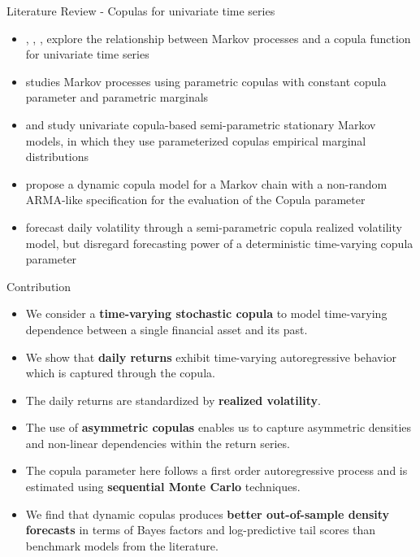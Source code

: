 \documentclass[9pt,xcolor=x11names,compress]{beamer}
\newcommand{\btext}{\textcolor{dblue}}
\newcommand{\bbtext}[1]{ \textcolor{dblue}{\textbf{#1}}}
\newcommand{\rbtext}[1]{ \textcolor{dred}{\textbf{#1}}}
\let\natbibcitet\citet
\renewcommand\citet{\bibpunct{(}{)}{,}{a}{,}{,}\natbibcitet}
\let\oldcite=\cite
\renewcommand{\cite}[1]{\textcolor{dblue}{\oldcite{#1}}}
\begin{document}
\begin{frame}{Literature Review - Copulas for univariate time series}
	\begin{itemize}
		\item \cite{darsow1992}, \cite{ibragimov2008}, \cite{ibragimov2009}, \cite{Beare20010} explore the relationship between Markov processes and a copula function for univariate time series
		\item \btext{\citet[][Chapter 8]{Joe1997}} studies Markov processes using parametric copulas with constant copula parameter and parametric marginals
		\item \cite{Chen2006} and \cite{Chen2009} study univariate copula-based semi-parametric stationary Markov models, in which they use parameterized copulas empirical marginal distributions
		\item \cite{Abegaz2008} propose a dynamic copula model for a Markov chain with a non-random ARMA-like specification for the evaluation of the Copula parameter
		\item \cite{sokolinskiy2011} forecast daily volatility through a semi-parametric copula realized volatility model, but disregard forecasting power of a deterministic time-varying copula parameter	
	\end{itemize}
\end{frame}

\begin{frame}{Contribution}
	\begin{itemize}
		\item We consider a\bbtext{time-varying stochastic copula} to model time-varying dependence between a single financial asset and its past. 
		\item We show that \rbtext{daily returns} exhibit time-varying autoregressive behavior which is captured through the copula. 
		\item The daily returns are standardized by\bbtext{realized volatility}.
		\item The use of \rbtext{asymmetric copulas} enables us to capture asymmetric densities and non-linear dependencies within the return series. 
		\item The copula parameter here follows a first order autoregressive process and is estimated using \bbtext{sequential Monte Carlo} techniques. 
		\item We find that dynamic copulas produces \rbtext{better out-of-sample density forecasts} in terms of Bayes factors and log-predictive tail scores than benchmark models from the literature. 
	\end{itemize}
\end{frame}
\end{document}
